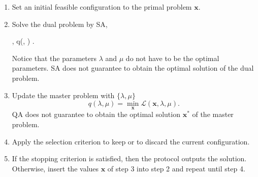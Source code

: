 \begin{enumerate}
    \item Set an initial feasible configuration to the primal problem $\mathbf{x}$.
    \item Solve the dual problem by SA,
\begin{maxi!}[4]
	{\lambda, \mu}{q(\lambda, \mu)}{}{}{}
	.
\end{maxi!}
Notice that the parameters $\lambda$ and $\mu$ do not have to be the optimal parameters. SA does not guarantee to obtain the optimal solution of the dual problem.
    \item Update the master problem with $\{\lambda, \mu\}$ 
    \begin{equation}
        q(\lambda,\mu) = \min_{\mathbf{x}} \mathcal{L}(\mathbf{x}, \lambda, \mu).
    \end{equation}
     QA does not guarantee to obtain the optimal solution $\mathbf{x}^{*}$ of the master problem.
    \item Apply the selection criterion to keep or to discard the current configuration.
    \item If the stopping criterion is satisfied, then the protocol outputs the solution. Otherwise, insert the values $\mathbf{x}$ of step 3 into step 2 and repeat until step 4.
\end{enumerate}



